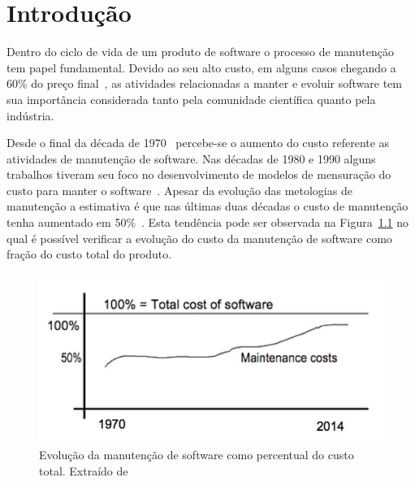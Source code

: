 \chapter{Introdução}
\label{ch:intro}

Dentro do ciclo de vida de um produto de software o processo de manutenção tem
papel fundamental. Devido ao seu alto custo, em alguns casos chegando a 60\%
do preço final~\cite{kaur2015review}, as atividades relacionadas a manter e evoluir software tem sua
importância considerada tanto pela comunidade científica quanto pela indústria.

Desde o final da década de 1970~\cite{Zelkowitz:1979:PSE:578504} percebe-se o aumento do custo
referente as atividades de  manutenção de software. Nas décadas de 1980 e 1990 alguns trabalhos
tiveram seu foco no desenvolvimento de modelos de mensuração do custo para manter o
software~\cite{Herrin:1985:SMC:323287.323383,hirota1994approach}. Apesar da evolução das metologias
de manutenção a estimativa é que nas últimas duas décadas o custo de manutenção tenha aumentado em
50\%~\cite{koskinen2010software}. Esta tendência pode ser observada na
Figura~\ref{fig:software-maintence-costs} no qual é possível verificar a evolução do custo da
manutenção de software como fração do custo total do produto.

\begin{figure}
\centering
\includegraphics[width=0.7\linewidth]{./chapter-intro/img/software-maintence-costs}
\caption{Evolução da manutenção de software como percentual do custo total.	Extraído de~\cite{engelbertink2010save}}
\label{fig:software-maintence-costs}
\end{figure}


